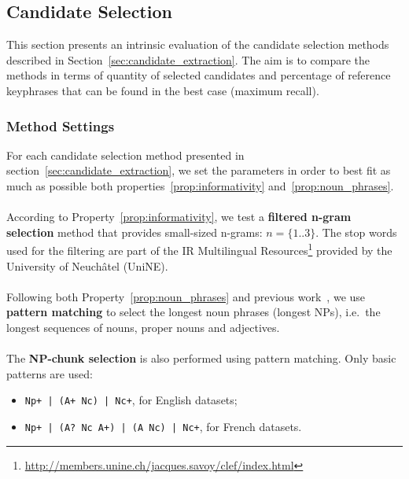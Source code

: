   \subsection{Candidate Selection}
  \label{subsec:candidate_extraction}

    This section presents an intrinsic evaluation of the candidate selection
    methods described in Section~\ref{sec:candidate_extraction}. The aim is to
    compare the methods in terms of quantity of selected candidates and
    percentage of reference keyphrases that can be found in the best case
    (maximum recall).

    \subsubsection{Method Settings}
    \label{subsubsec:method_settings}
      For each candidate selection method presented in
      section~\ref{sec:candidate_extraction}, we set the parameters in order to
      best fit as much as possible both properties~\ref{prop:informativity}
      and~\ref{prop:noun_phrases}.

      \paragraph{}
      According to Property~\ref{prop:informativity}, we test a \textbf{filtered
      n-gram selection} method that provides small-sized n-grams:
      $n = \{1..3\}$. The stop words used for the filtering are part of the IR
      Multilingual
      Resources\footnote{\url{http://members.unine.ch/jacques.savoy/clef/index.html}}
      provided by the University of Neuchâtel (UniNE).

      \paragraph{}
      Following both Property~\ref{prop:noun_phrases} and previous
      work~\cite{hassan2010conundrums}, we use \textbf{pattern matching} to
      select the longest noun phrases (longest NPs), i.e.~the longest sequences
      of nouns, proper nouns and adjectives.

      \paragraph{}
      The \textbf{NP-chunk selection} is also performed using pattern matching.
      Only basic patterns are used:
      \begin{itemize}
        \item{\texttt{Np+ |~(A+~Nc) |~Nc+}, for English datasets;}
        \item{\texttt{Np+ |~(A?~Nc~A+) |~(A~Nc) |~Nc+}, for French datasets.}
      \end{itemize}


